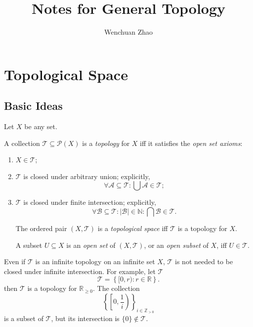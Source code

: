 \documentclass{report}
\title{Notes for General Topology}
\author{Wenchuan Zhao}
\begin{document}
\maketitle
\tableofcontents




\chapter{Topological Space}

\section{Basic Ideas}


\begin{definition}
	\label{def: topology}
	
	Let $X$ be any set.
	
	A collection $\mathcal T \subseteq \mathcal P(X)$ is a \textit{topology} for $X$ iff it satisfies the \textit{open set axioms}:
	\begin{enumerate}
		\item
		$X \in \mathcal T$;
		
		\item
		$\mathcal T$ is closed under arbitrary union; explicitly,
		$$
		\forall \mathcal A \subseteq \mathcal T: \bigcup \mathcal A \in \mathcal T;
		$$
		
		\item
		$\mathcal T$ is closed under finite intersection; explicitly,
		$$
		\forall \mathcal B \subseteq \mathcal T : |\mathcal B| \in \mathbb N : \bigcap \mathcal B \in \mathcal T.
		$$
		
		The ordered pair $(X, \mathcal T)$ is a \textit{topological space} iff $\mathcal T$ is a topology for $X$.
		
		A subset $U \subseteq X$ is an \textit{open set} of $(X, \mathcal T)$, or an \textit{open subset} of $X$, iff $U \in \mathcal T$.
	\end{enumerate}
\end{definition}


\begin{note}
	Even if $\mathcal T$ is an infinite	topology on an infinite set $X$, $\mathcal T$ is not needed to be closed under infinite intersection. For example, let $\mathcal T$
	$$
	\mathcal T = \left\{ [0,r): r \in \mathbb R \right\}.
	$$
	then $\mathcal T$ is a topology for $\mathbb R_{\ge 0}$. The collection
	$$
	\left\{ \left[ 0, \frac{1}{i} \right) \right\}_{i \in \mathbb Z_{> 0}}
	$$
	is a subset of $\mathcal T$, but its intersection is $\{0\} \notin \mathcal T$.
\end{note}
\end{document}
